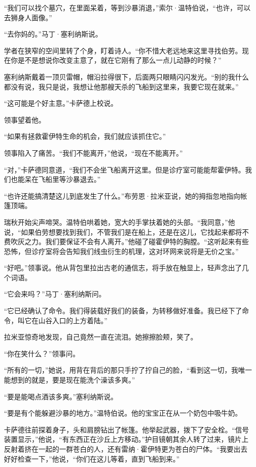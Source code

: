 \documentclass[AutoFakeBold=true]{book}
\begin{document}
``我们可以找个墓穴，在里面呆着，等到沙暴消退，''索尔·温特伯说，``也许，可以去狮身人面像。''

``去你妈的。''马丁·塞利纳斯说。

学者在狭窄的空间里转了个身，盯着诗人。``你不惜大老远地来这里寻找伯劳。现在你是不是想说你改变主意了，就在它刚有了那么一点儿动静的时候？''

塞利纳斯戴着一顶贝雷帽，帽沿拉得很下，后面两只眼睛闪闪发光。``别的我什么都没有说，我只是说，我想让他那艘天杀的飞船到这里来，我要它现在就来。''

``这可能是个好主意。''卡萨德上校说。

领事望着他。

``如果有拯救霍伊特生命的机会，我们就应该抓住它。''

领事陷入了痛苦。``我们不能离开，''他说，``现在不能离开。''

``对，''卡萨德同意道，``我们不会坐飞船离开这里。但是诊疗室可能能帮霍伊特。我们也能呆在飞船里等沙暴退去。''

``也许还能搞清楚这儿到底发生了什么。''布劳恩·拉米亚说，她的拇指忽地指向帐篷顶端。

瑞秋开始尖声啼哭。温特伯哄着她，宽大的手掌扶着她的头部。``我同意，''他说，``如果伯劳想要找到我们，不管我们是在船上，还是在这儿，它找起来都将不费吹灰之力。我们要保证不会有人离开。''他碰了碰霍伊特的胸膛。``这听起来有些恐怖，但诊疗室将会告知我们线虫衍生的机理，这对环网来说将是无价之宝。''

``好吧。''领事说。他从背包里拉出古老的通信志，将手放在触显上，轻声念出了几个词语。

``它会来吗？''马丁·塞利纳斯问。

``它已经确认了命令。我们得装载好我们的装备，为转移做好准备。我已经下了命令，叫它在山谷入口的上方着陆。''

拉米亚惊奇地发现，自己竟然一直在流泪。她擦擦脸颊，笑了。

``你在笑什么？''领事问。

``所有的一切，''她说，用背在背后的那只手拧了拧自己的脸，``看到这一切，我唯一能想到的就是，要是现在能洗个澡该多爽。''

``要是能喝点酒该多爽。''塞利纳斯说。

``要是有个能躲避沙暴的地方。''温特伯说。他的宝宝正在从一个奶包中吸牛奶。

卡萨德往前探着身子，头和肩膀钻出了帐篷。他举起武器，拨下了安全栓。``信号装置显示，''他说，``有东西正在沙丘上方移动。''护目镜朝其余人转了过来，镜片上反射着挤在一起的一群苍白的人，还有雷纳·霍伊特更为苍白的尸体。``我要出去好好检查一下，''他说，``你们在这儿等着，直到飞船到来。''
\end{document}

